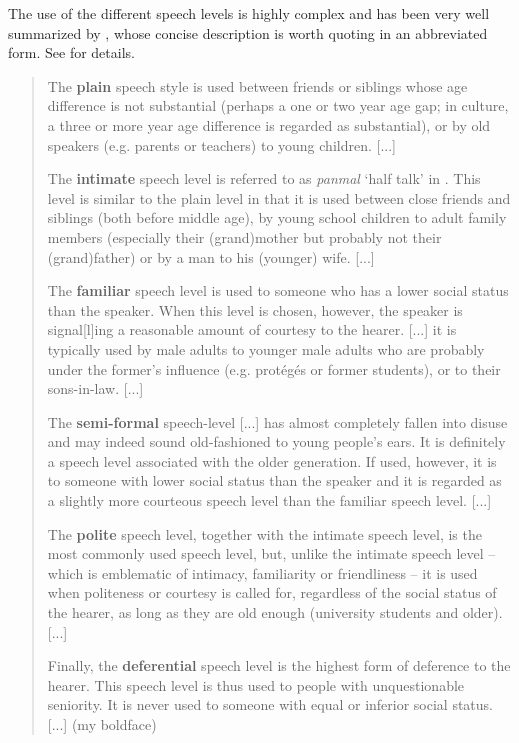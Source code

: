 The use of the different speech levels is highly complex and has been very well summarized by \cite[126f.]{Song2005}, whose concise description is worth quoting in an abbreviated form. See \citet{Brown2011} for details.

\largerpage
\begin{quote}
The \textbf{plain} speech style is used between friends or siblings whose age difference is not substantial (perhaps a one or two year age gap; in  culture, a three or more year age difference is regarded as substantial), or by old speakers (e.g. parents or teachers) to young children. [...]

The \textbf{intimate} speech level is referred to as \textit{panmal} ‘half talk’ in . This level is similar to the plain level in that it is used between close friends and siblings (both before middle age), by young school children to adult family members (especially their (grand)mother but probably not their (grand)father) or by a man to his (younger) wife. [...]

The \textbf{familiar} speech level is used to someone who has a lower social status than the speaker. When this level is chosen, however, the speaker is signal[l]ing a reasonable amount of courtesy to the hearer. [...] it is typically used by male adults to younger male adults who are probably under the former’s influence (e.g. protégés or former students), or to their sons-in-law. [...]

The \textbf{semi-formal} speech-level [...] has almost completely fallen into disuse and may indeed sound old-fashioned to young people’s ears. It is definitely a speech level associated with the older generation. If used, however, it is to someone with lower social status than the speaker and it is regarded as a slightly more courteous speech level than the familiar speech level. [...]

The \textbf{polite} speech level, together with the intimate speech level, is the most commonly used speech level, but, unlike the intimate speech level -- which is emblematic of intimacy, familiarity or friendliness -- it is used when politeness or courtesy is called for, regardless of the social status of the hearer, as long as they are old enough (university students and older). [...]

Finally, the \textbf{deferential} speech level is the highest form of deference to the hearer. This speech level is thus used to people with unquestionable seniority. It is never used to someone with equal or inferior social status. [...] (my boldface)
\end{quote}

